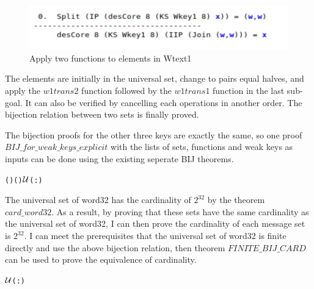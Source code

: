 \documentclass{article}
\begin{document}
\begin{figure}
\centering
\includegraphics[width=0.25\linewidth]{BIJ}
\caption{\label{fig:form5} Apply two functions to elements in Wtext1}
\end{figure}

The elements are initially in the universal set, change to pairs equal halves, and apply the $w1trans2$ function followed
by the $w1trans1$ function in the last sub-goal. It can also be verified by cancelling each operations in another order.
The bijection relation between two sets is finally proved.

The bijection proofs for the other three keys are exactly the same, so one proof $BIJ\_for\_weak\_keys\_explicit$ with the lists of sets, functions and
weak keys as inputs can be done using the existing seperate BIJ theorems.

\begin{alltt}
   \HOLTokenTurnstile{}  \HOLSymConst{\HOLTokenLt{}}  \HOLSymConst{\HOLTokenImp{}}  (  ) (  ) \ensuremath{{\cal{U}}}(:)
\end{alltt}

The universal set of word32 has the cardinality of $2^{32}$ by the theorem $card\_word32$. As a result, by proving that
these sets have the same cardinality as the universal set of word32, I can then prove the cardinality of each message set
is $2^{32}$. I can meet the prerequisites that the universal set of word32 is finite directly and use the above
bijection relation, then theorem $FINITE\_BIJ\_CARD$ can be used to prove the equivalence of cardinality.

\begin{alltt}
   \HOLTokenTurnstile{}  \ensuremath{{\cal{U}}}(:) \HOLSymConst{=}  \HOLSymConst{\HOLTokenExp{}} 
\end{alltt}

\begin{alltt}
   \HOLTokenTurnstile{}   \HOLSymConst{\HOLTokenConj{}}     \HOLSymConst{\HOLTokenImp{}}   \HOLSymConst{=}  
\end{alltt}
\end{document}
